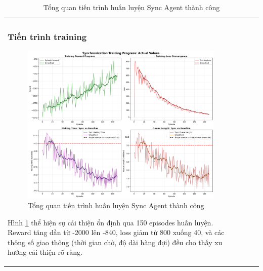 \begin{table}[!htp]
\begin{tabular}{@{}lccc@{}}
\subsubsection{Tiến trình training}

\begin{figure}[!htp]
    \centering
    \includegraphics[width=\textwidth]{figures/training_overview.png}
    \caption{Tổng quan tiến trình huấn luyện Sync Agent thành công}
    \label{fig:sync_training_overview}
\end{figure}

Hình \ref{fig:sync_training_overview} thể hiện sự cải thiện ổn định qua 150 episodes huấn luyện. Reward tăng dần từ -2000 lên -840, loss giảm từ 800 xuống 40, và các thông số giao thông (thời gian chờ, độ dài hàng đợi) đều cho thấy xu hướng cải thiện rõ ràng.





\end{tabular}
\end{table}

